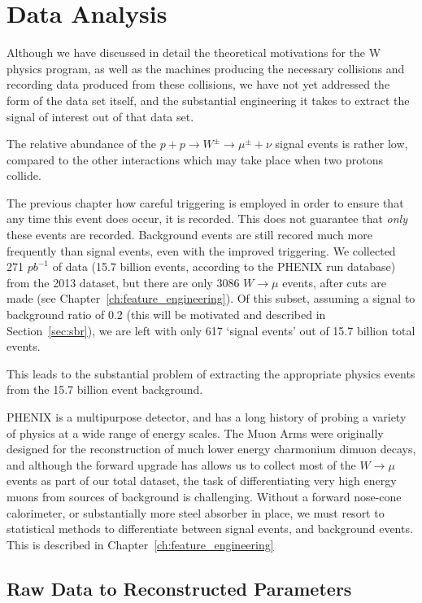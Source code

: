 \chapter{Data Analysis}
\label{ch:data_analysis}
Although we have discussed in detail the theoretical motivations for the W
physics program, as well as the machines producing the necessary collisions and
recording data produced from these collisions, we have not yet addressed the
form of the data set itself, and the substantial engineering it takes to extract
the signal of interest out of that data set.

The relative abundance of the $p + p \rightarrow W^\pm \rightarrow \mu^\pm +
\nu$ signal events is rather low, compared to the other interactions which may
take place when two protons collide. 

The previous chapter how careful triggering is employed in order to ensure that
any time this event does occur, it is recorded. This does not guarantee that
\textit{only} these events are recorded. Background events are still recored
much more frequently than signal events, even with the improved triggering. We
collected 271 $pb^{-1}$ of data (15.7 billion events, according to the PHENIX
run database) from the 2013 dataset, but there are only 3086 $W\rightarrow\mu$
events, after cuts are made (see Chapter~\ref{ch:feature_engineering}).  Of this
subset, assuming a signal to background ratio of 0.2 (this will be motivated and
described in Section~\ref{sec:sbr}), we are left with only 617 `signal events'
out of 15.7 billion total events.

This leads to the substantial problem of extracting the appropriate physics
events from the 15.7 billion event background. 

PHENIX is a multipurpose detector, and has a long history of probing a variety
of physics at a wide range of energy scales. The Muon Arms were originally
designed for the reconstruction of much lower energy charmonium dimuon decays,
and although the forward upgrade has allows us to collect most of the
$W\rightarrow\mu$ events as part of our total dataset, the task of
differentiating very high energy muons from sources of background is
challenging. Without a forward nose-cone calorimeter, or substantially more
steel absorber in place, we must resort to statistical methods to differentiate
between signal events, and background events. This is described in
Chapter~\ref{ch:feature_engineering}

\section{Raw Data to Reconstructed Parameters}

